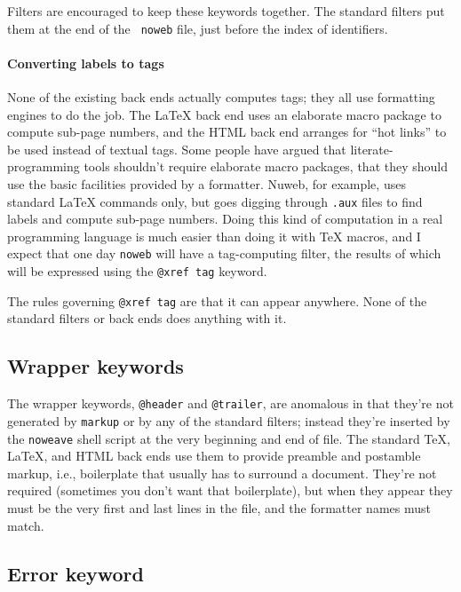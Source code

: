 \documentclass{article}
\makeatletter
\newcommand\kw[1]{\texttt{@#1}}
\newcommand\xkw[1]{\kw{xref~#1}}
\makeatother
\begin{document}
Filters are encouraged to keep these keywords together.
The standard filters put them at the end of the {\tt
noweb} file, just before the index of identifiers.


\paragraph{Converting labels to tags}

None of the existing back ends actually computes tags; they all use
formatting engines to do the job.
The {\LaTeX} back end uses an elaborate macro package to compute
sub-page numbers, and the HTML back end arranges for ``hot links'' to
be used instead of textual tags.
Some people have argued that literate-programming tools shouldn't require
elaborate macro packages, that they should use the basic facilities
provided by a formatter.  Nuweb, for example, uses standard {\LaTeX}
commands only, but goes digging through {\tt .aux} files to find
labels and compute sub-page numbers.
Doing this kind of computation in a real programming language is much
easier than doing it with {\TeX} macros, and I expect that one day
{\tt noweb} will have a tag-computing filter, the results of
which will be expressed using the \xkw{tag} keyword.

The rules governing \xkw{tag} are that it can appear anywhere.
None of the standard filters or back ends does anything with it.



\subsection{Wrapper keywords}

The wrapper keywords, \kw{header} and \kw{trailer}, are anomalous in
that they're not generated by {\tt markup} or by any of the
standard filters; instead they're inserted by the {\tt noweave} shell
script at the very beginning and end of file.
The standard {\TeX}, {\LaTeX}, and HTML back ends use them to provide
preamble and postamble markup, i.e., boilerplate that usually has to
surround a document.
They're not required (sometimes you don't want that boilerplate), but
when they appear they must be the very first and last lines in the
file, and the formatter names must match.

\subsection{Error keyword}
\end{document}
